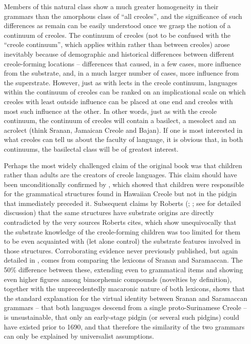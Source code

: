 Members of this natural class show a much greater homogeneity in their grammars than the amorphous class of “all creoles”, and the significance of such differences as remain can be easily understood once we grasp the notion of a continuum of creoles. The continuum of creoles (not to be confused with the “creole continuum”, which applies within rather than between creoles) arose inevitably because of demographic and historical differences between different creole-forming locations -- differences that caused, in a few cases, more influence from the substrate, and, in a much larger number of cases, more influence from the superstrate. However, just as with lects in the creole continuum, languages within the continuum of creoles can be ranked on an implicational scale on which creoles with least outside influence can be placed at one end and creoles with most such influence at the other. In other words, just as with the creole continuum, the continuum of creoles will contain a basilect, a mesolect and an acrolect (think Sranan, Jamaican Creole and Bajan). If one is most interested in what creoles can tell us about the faculty of language, it is obvious that, in both continuums, the basilectal class will be of greatest interest.

Perhaps the most widely challenged claim of the original book was that children rather than adults are the creators of creole languages. This claim should have been unconditionally confirmed by \citet{Roberts1998}, which showed that children were responsible for the grammatical structures found in Hawaiian Creole but not in the pidgin that immediately preceded it. Subsequent claims by Roberts (\citeyear{Roberts2000}; \citeyear{Roberts2004}; see \citealt{Bickerton2014} for detailed discussion) that the same structures have substrate origins are directly contradicted by the very sources Roberts cites, which show unequivocally that the substrate knowledge of the creole-forming children was too limited for them to be even acquainted with (let alone control) the substrate features involved in those structures. Corroborating evidence never previously published, but again detailed in \citet{Bickerton2014}, comes from comparing the lexicons of Sranan and Saramaccan. The 50\% difference between these, extending even to grammatical items and showing even higher figures among bimorphemic compounds (novelties by definition), together with the unprecedentedly macaronic nature of both lexicons, shows that the standard explanation for the virtual identity between Sranan and Saramaccan grammars -- that both languages descend from a single proto-Surinamese Creole -- is unsustainable, that only an early-stage pidgin (or several such pidgins) could have existed prior to 1690, and that therefore the similarity of the two grammars can only be explained by universalist assumptions. 

